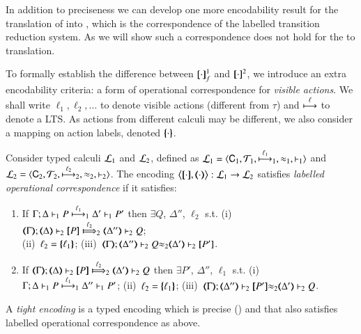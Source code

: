 
In addition to preciseness we can develop one more encodability
result for the translation of \HOp into \HO, which is
the correspondence of the labelled transition reduction
system. As we will show such a correspondence does not
hold for the \HOp to \sessp translation.

To formally establish the difference between $\map{\cdot}_f^1$ and $\pmap{\cdot}{2}$,
we introduce an extra encodability criteria: a form of operational correspondence 
for \emph{visible actions}. 
We shall write $\ell_1, \ell_2, \ldots$ to denote visible 
actions (different from $\tau$)
and  $\hby{\ell}$ to denote a LTS.
As actions from different calculi may be different, we also consider a mapping 
on action labels, denoted $\mapa{\cdot}$.

\begin{definition}%
\label{def:lopco}
       Consider typed calculi $\tyl{L}_1$ and  $\tyl{L}_2$, defined as 
        $\tyl{L}_1=\calc{\CAL_1}{{\cal{T}}_1}{\hby{{\ell_1}}_1}{\wb_1}{\proves_1}$
       and $\tyl{L}_2=\calc{\CAL_2}{{\cal{T}}_2}{\hby{{\ell_2}}_2}{\wb_2}{\proves_2}$.
The encoding $\enco{\map{\cdot}, \mapt{\cdot}}: \tyl{L}_1 \to \tyl{L}_2$ satisfies
\emph{labelled operational correspondence}
if it satisfies:
	\begin{enumerate}[1.]
			\item
					If		$\stytraargi{\Gamma}{\ell_1}{\Delta}{P}{\Delta'}{P'}{1}{1}$
					then	$\exists Q$, $\Delta''$, $\ell_2$ s.t. 
							(i)~$\wtytraargi{\mapt{\Gamma}}{\ell_2}{\mapt{\Delta}}{\map{P}}{\mapt{\Delta''}}{Q}{2}{2}$;  \\
							(ii)~$\ell_2 = \mapa{\ell_1}$; 
							(iii)~${\mapt{\Gamma}};{\mapt{\Delta''}}\proves_2 {Q}{\wb_2}{\mapt{\Delta'}}\proves_2 {\map{P'}}$.
				
			\item
					If		$\wtytraargi{\mapt{\Gamma}}{\ell_2}{\mapt{\Delta}}{\map{P}}{\mapt{\Delta'}}{Q}{2}{2}$
					then	$\exists P'$, $\Delta''$, $\ell_1$ s.t. 
							(i)~$\stytraargi{\Gamma}{\ell_1}{\Delta}{P}{\Delta''}{P'}{1}{1}$;
							(ii)~$\ell_2 = \mapa{\ell_1}$;
							(iii)~${\mapt{\Gamma}};{\mapt{\Delta''}}\proves_2 {\map{P'}}{\wb_2}{\mapt{\Delta'}}\proves_2 {Q}$.
	\end{enumerate}
A \emph{tight encoding} is a typed 
encoding 
which is precise () and that also satisfies 
labelled operational correspondence as above.
\end{definition}

